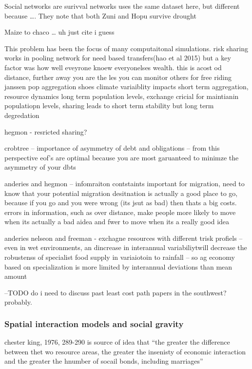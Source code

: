 \documentclass[10pt,letterpaper]{article}
\begin{document}
Social networks are surivval networks uses the same dataset here, but
different because \ldots{}. They note that both Zuni and Hopu survive
drought

Maize to chaco \ldots{} uh just cite i guess

This problem has been the focus of many computaitonal simulations. risk
sharing works in pooling network for need based transfers(hao et al
2015) but a key factor was how well eveyrone knoew everyonelses wealth.
this is acost od distance, further away you are the les you can monitor
others for free riding janssen pop aggregation shoes climate variaiblity
impacts short term aggregation, resource dynamics long term population
levels, exchange cricial for maintianin populatiopn levels, sharing
leads to short term stability but long term degredation

hegmon - resricted sharing?

crobtree -- importance of asymmetry of debt and obligations -- from this
perspective eof's are optimal because you are most garuanteed to minimze
the asymmetry of your dbts

anderies and hegmon -- infomraiton contstaints important for migration,
need to know that your potential migration desitnation is actually a
good place to go, because if you go and you were wrong (its jsut as bad)
then thats a big costs. errors in information, such as over distance,
make people more likely to move when its actually a bad aidea and fwer
to move when its a really good idea

anderies nelseon and freeman - exchagne resources with different trisk
profiels -- even in wet environments, an dincrease in interannual
variabiliytwill decrease the robustenss of specialist food supply in
variaiotoin to rainfall -- so ag economy based on specialization is more
limited by interannual deviations than mean amount

--TODO do i need to discuss past least cost path papers in the
southwest? probably.

\subsubsection{Spatial interaction models and social
gravity}\label{spatial-interaction-models-and-social-gravity}

chester king, 1976, 289-290 is source of idea that ``the greater the
difference between thet wo resource areas, the greater the insenisty of
economic interaction and the greater the hnumber of socail bonds,
including marriages''
\end{document}
